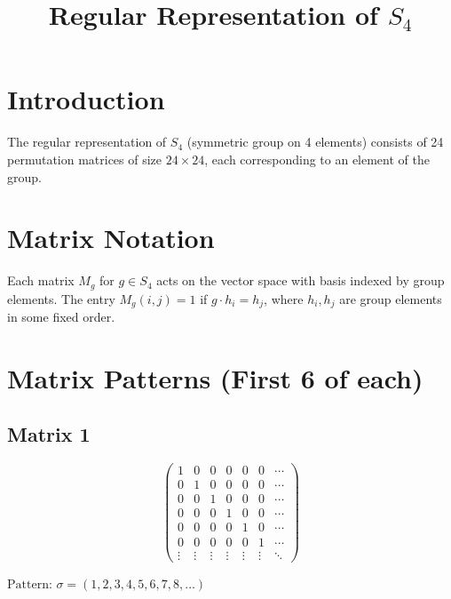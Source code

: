 \documentclass{article}
\begin{document}
\title{Regular Representation of $S_4$}
\author{}
\date{}
\maketitle

\section*{Introduction}
The regular representation of $S_4$ (symmetric group on 4 elements) consists of 24 permutation matrices of size $24 \times 24$, each corresponding to an element of the group.

\section*{Matrix Notation}
Each matrix $M_g$ for $g \in S_4$ acts on the vector space with basis indexed by group elements. The entry $M_g(i,j) = 1$ if $g \cdot h_i = h_j$, where $h_i, h_j$ are group elements in some fixed order.

\section*{Matrix Patterns (First 6 of each)}

\subsection*{Matrix 1}
$$
\begin{pmatrix}
  1 & 0 & 0 & 0 & 0 & 0 & \cdots \\
  0 & 1 & 0 & 0 & 0 & 0 & \cdots \\
  0 & 0 & 1 & 0 & 0 & 0 & \cdots \\
  0 & 0 & 0 & 1 & 0 & 0 & \cdots \\
  0 & 0 & 0 & 0 & 1 & 0 & \cdots \\
  0 & 0 & 0 & 0 & 0 & 1 & \cdots \\
  
\vdots & \vdots & \vdots & \vdots & \vdots & \vdots & \ddots
\end{pmatrix}
$$

$\text{Pattern: } \sigma = (1, 2, 3, 4, 5, 6, 7, 8, \ldots)$\\
\vspace{0.5em}
\end{document}
